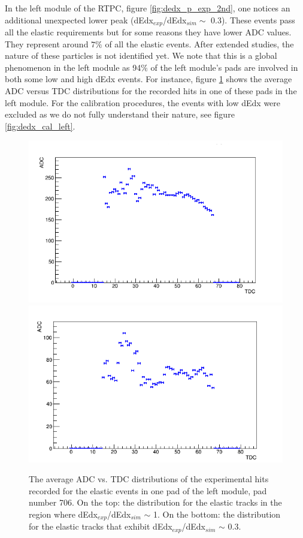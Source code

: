 In the left module of the RTPC, figure \ref{fig:dedx_p_exp_2nd}, one notices an 
additional unexpected lower peak (dEdx$_{exp}$/dEdx$_{sim} \sim$ 0.3). These 
events pass all the elastic requirements but for some reasons they have lower 
ADC values. They represent around $7\%$ of all the elastic events. After 
extended studies, the nature of these particles is not identified yet. We note 
that this is a global phenomenon in the left module as 94$\%$ of the left 
module's pads are involved in both some low and high dEdx events. For instance, 
figure \ref{fig:Chann_706} shows the average ADC versus TDC distributions for 
the recorded hits in one of these pads in the left module. For the calibration 
procedures, the events with low dEdx were excluded as we do not fully 
understand their nature, see figure \ref{fig:dedx_cal_left}.\\
\begin{figure}[tbp]
\centering
\includegraphics[scale=0.4]{fig_rtpc/Chan_706_1.png}
\includegraphics[scale=0.4]{fig_rtpc/Chan_706_2.png}
\caption{The average ADC vs. TDC distributions of the experimental hits recorded for the elastic events in one pad of the left module, pad number 706. On the top: the distribution for the elastic tracks in the region where dEdx$_{exp}$/dEdx$_{sim} $ $\sim$ 1. On the bottom: the distribution for the elastic tracks that exhibit dEdx$_{exp}$/dEdx$_{sim} $ $\sim$ 0.3.}
\label{fig:Chann_706}
\end{figure}

